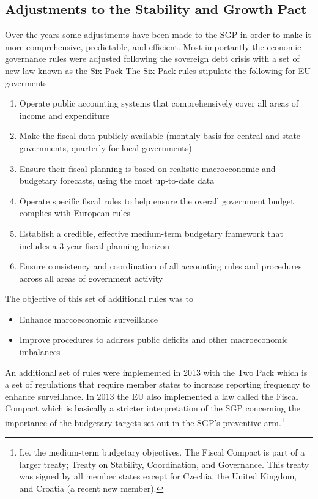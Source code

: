 \documentclass{tufte-handout}
\begin{document}
\subsection{Adjustments to the Stability and Growth Pact}
Over the years some adjustments have been made to the SGP in order to make it more comprehensive, predictable, and efficient. 
Most importantly the economic governance rules were adjusted following the sovereign debt crisis with a set of new law known as the Six Pack
The Six Pack rules stipulate the following for EU goverments 

\begin{enumerate}
  \item Operate public accounting systems that comprehensively cover all areas of income and expenditure
  \item Make the fiscal data publicly available (monthly basis for central and state governments, quarterly for local governments)
  \item Ensure their fiscal planning is based on realistic macroeconomic and budgetary forecasts, using the most up-to-date data
  \item Operate specific fiscal rules to help ensure the overall government budget complies with European rules
  \item Establish a credible, effective medium-term budgetary framework that includes a 3 year fiscal planning horizon
  \item Ensure consistency and coordination of all accounting rules and procedures across all areas of government activity
\end{enumerate}

The objective of this set of additional rules was to
\begin{itemize}
  \item Enhance marcoeconomic surveillance
  \item Improve procedures to address public deficits and other macroeconomic imbalances 
\end{itemize}

An additional set of rules were implemented in 2013 with the Two Pack which is a set of regulations that require member states to increase 
reporting frequency to enhance surveillance. 
In 2013 the EU also implemented a law called the Fiscal Compact which is basically a stricter interpretation of the SGP concerning the importance of the budgetary targets set out in the SGP's preventive arm.\footnote{I.e. the medium-term budgetary objectives. The Fiscal Compact is part of a larger treaty; Treaty on Stability, Coordination, and Governance. This treaty was signed by all member states except for Czechia, the United Kingdom, and Croatia (a recent new member).}
\end{document}
